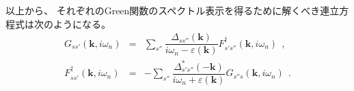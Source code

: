 \documentclass[a4j]{jsarticle}
\begin{document}
%
%
%
%
以上から、
それぞれのGreen関数のスペクトル表示を得るために解くべき連立方程式は次のようになる。
%
%
%
%
\begin{eqnarray}
	G_{ss'}(\bm{k} , i \omega_{n} )
	&=&
	\sum_{s''}
	\dfrac{
		\Delta_{ s s'' }( \bm{k} )
	}{
		i \omega_{n} - \varepsilon( \bm{k} )
	}
	F_{ s' s'' }^{\dagger} ( \bm{k} , i \omega_{n} )
	\ \ ,
	\\[4mm]
	F_{ss'}^{\dagger} (\bm{k} , i \omega_{n} )
	&=&
	-
	\sum_{ s'' }
	\dfrac{
		\Delta_{ s' s'' }^{*} ( - \bm{k} )
	}
	{
		i \omega_{n} + \varepsilon( \bm{k} )
	}
	G_{s''s} (\bm{k} , i \omega_{n} )
	\ \ .
\end{eqnarray}
%
%
%
%
\end{document}
